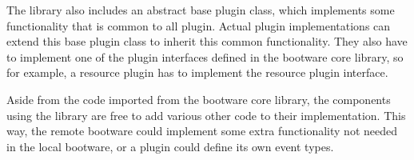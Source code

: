 The library also includes an abstract base plugin class, which implements some functionality that is common to all plugin.
Actual plugin implementations can extend this base plugin class to inherit this common functionality.
They also have to implement one of the plugin interfaces defined in the bootware core library, so for example, a resource plugin has to implement the resource plugin interface.

Aside from the code imported from the bootware core library, the components using the library are free to add various other code to their implementation.
This way, the remote bootware could implement some extra functionality not needed in the local bootware, or a plugin could define its own event types.
